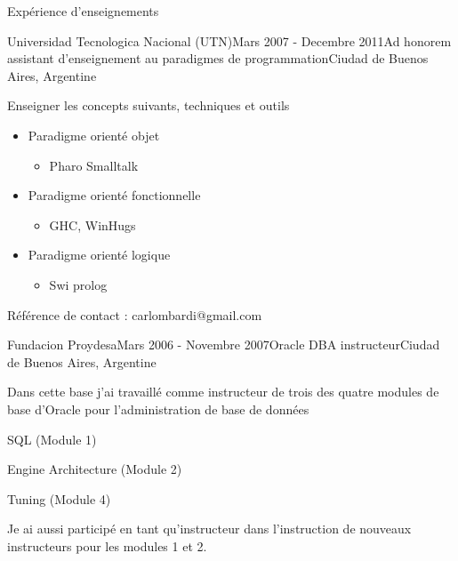 \documentclass{resume} %
\begin{document}
\begin{rSection}{Exp\'{e}rience d'enseignements}
\begin{rSubsection}{Universidad Tecnologica Nacional (UTN)}{Mars 2007 - Decembre 2011}{Ad honorem assistant d'enseignement au paradigmes de programmation}{Ciudad de Buenos Aires, Argentine}
\item Enseigner les concepts suivants, techniques et outils
\begin{itemize}
	\item Paradigme orient\'{e} objet
	\begin{itemize}
		\item Pharo Smalltalk
	\end{itemize}
	\item Paradigme orient\'{e} fonctionnelle
	\begin{itemize}
		\item GHC, WinHugs
	\end{itemize}
	\item Paradigme orient\'{e} logique
	\begin{itemize}
		\item  Swi prolog
	\end{itemize}
\end{itemize}
\item R\'{e}f\'{e}rence de contact : carlombardi@gmail.com
\end{rSubsection}


\begin{rSubsection}{Fundacion Proydesa}{Mars 2006 - Novembre 2007}{Oracle DBA instructeur}{Ciudad de Buenos Aires, Argentine}
	\item Dans cette base j'ai travaill\'{e} comme instructeur de trois des quatre modules de base d'Oracle pour l'administration de base de donn\'{e}es
	\item SQL (Module 1)
	\item Engine Architecture (Module 2)
	\item Tuning (Module 4)
	\item Je ai aussi particip\'{e} en tant qu'instructeur dans l'instruction de nouveaux instructeurs pour les modules 1 et 2.
\end{rSubsection}


\end{rSection}
\end{document}

